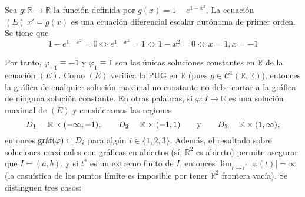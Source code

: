 \documentclass[11pt]{report}
\newcommand{\R}{\mathbb R}
\begin{document}
Sea $g \colon \R \to \R$ la función definida por $g(x)=1-e^{1-x^2}$. La ecuación $(E) \ x'=g(x)$ es una ecuación diferencial escalar autónoma de primer orden. Se tiene que
\[1-e^{1-x^2}=0 \iff e^{1-x^2}=1 \iff 1-x^2=0 \iff x=1,x=-1\]

Por tanto, $\varphi_{-1} \equiv -1$ y $\varphi_1\equiv 1$ son las únicas soluciones constantes en $\R$ de la ecuación $(E)$. Como $(E)$ verifica la PUG en $\R$ (pues $g \in \mathcal{C}^1(\R,\R)$), entonces la gráfica de cualquier solución maximal no constante no debe cortar a la gráfica de ninguna solución constante. En otras palabras, si $\varphi \colon I \to \R$ es una solución maximal de $(E)$ y consideramos las regiones
\[D_1= \R \times(-\infty,-1), \qquad D_2=\R \times (-1,1) \qquad \textup{y} \qquad D_3=\R \times (1,\infty),\]
entonces $\textup{gráf}(\varphi) \subset D_i$ para algún $i \in \{1,2,3\}$. Además, el resultado sobre soluciones maximales con gráficas en abiertos (sí, $\R^2$ es abierto) permite asegurar que $I=(a,b)$, y si $t^*$ es un extremo finito de $I$, entonces $\lim_{t \to t^*} |\varphi(t)|=\infty$ (la casuística de los puntos límite es imposible por tener $\R^2$ frontera vacía). Se distinguen tres casos:
\end{document}
